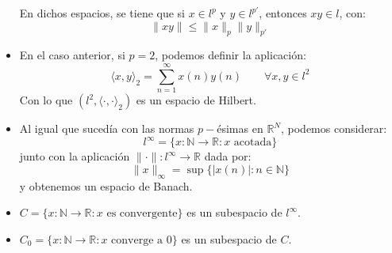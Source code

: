 \begin{itemize}
        En dichos espacios, se tiene que si $x\in l^p$ y $y\in l^{p'}$, entonces $xy\in l$, con:
        \begin{equation*}
            \|xy\| \leq \|x\|_p \|y\|_{p'}
        \end{equation*}
    \item En el caso anterior, si $p=2$, podemos definir la aplicación:
        \begin{equation*}
            \langle x,y \rangle_2 = \sum_{n=1}^{\infty}x(n)y(n) \qquad \forall x,y\in l^2
        \end{equation*}
        Con lo que $(l^2, \langle \cdot ,\cdot  \rangle _2)$ es un espacio de Hilbert.
    \item Al igual que sucedía con las normas $p-$ésimas en $\mathbb{R}^N$, podemos considerar:
        \begin{equation*}
            l^\infty = \{x:\mathbb{N}\to \mathbb{R} : x \text{\ acotada}\}
        \end{equation*}
        junto con la aplicación $\|\cdot \|:l^{\infty}\to \mathbb{R}$ dada por:
        \begin{equation*}
            \|x\|_\infty = \sup\{|x(n)| : n\in \mathbb{N}\}
        \end{equation*}
        y obtenemos un espacio de Banach.
    \item $C = \{x:\mathbb{N}\to \mathbb{R} : x \text{\ es convergente}\}$ es un subespacio de $l^\infty$.
    \item $C_0 = \{x:\mathbb{N}\to \mathbb{R} : x \text{\ converge a\ }0\}$ es un subespacio de $C$.
\end{itemize}

